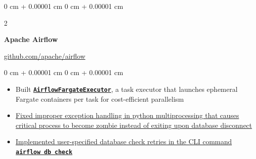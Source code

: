 \documentclass[10pt, letterpaper]{article}
\newenvironment{highlights}{
    \begin{itemize}[
        topsep=0.10 cm,
        parsep=0.10 cm,
        partopsep=0pt,
        itemsep=0pt,
        leftmargin=0 cm + 10pt
    ]
}{
    \end{itemize}
} %
\newenvironment{onecolentry}{
    \begin{adjustwidth}{
        0 cm + 0.00001 cm
    }{
        0 cm + 0.00001 cm
    }
}{
    \end{adjustwidth}
} %
\newenvironment{twocolentry}[2][]{
    \onecolentry
    \def\secondColumn{#2}
    \setcolumnwidth{\fill, 4.5 cm}
    \begin{paracol}{2}
}{
    \switchcolumn \raggedleft \secondColumn
    \end{paracol}
    \endonecolentry
} %
\begin{document}
        \begin{twocolentry}
            {\href{https://github.com/apache/airflow}{github.com/apache/airflow}}
            {\textbf{Apache Airflow}}
        \end{twocolentry}
        \vspace{0.1cm}
        \begin{onecolentry}
            \begin{highlights}
                \item Built \href{https://github.com/aelzeiny/airflow-aws-executors/tree/master}{\textbf{\texttt{AirflowFargateExecutor}}}, a task executor that launches ephemeral Fargate containers per task for cost-efficient parallelism
                \item \href{https://github.com/apache/airflow/issues/32706}{Fixed improper exception handling in python multiprocessing that causes critical process to become zombie instead of exiting upon database disconnect}
                \item \href{https://github.com/apache/airflow/pull/31836}{Implemented user-specified database check retries in the CLI command \texttt{\textbf{airflow db check}}}
            \end{highlights}
        \end{onecolentry}
\end{document}
